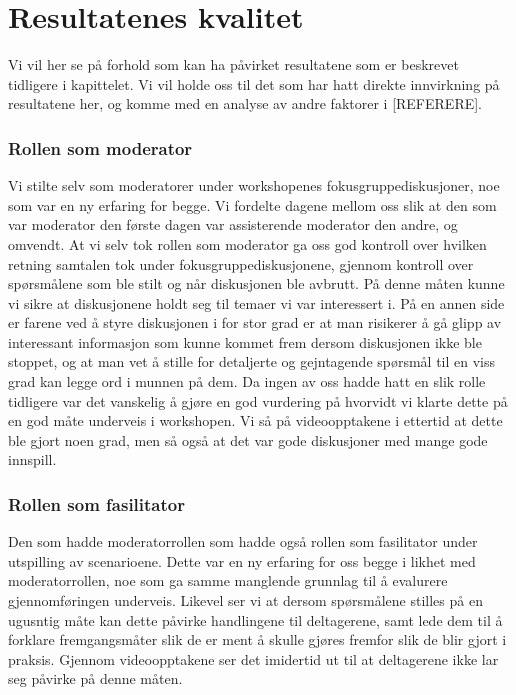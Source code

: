 \section{Resultatenes kvalitet}
\label{chp: analyse}

Vi vil her se på forhold som kan ha påvirket resultatene som er beskrevet tidligere i kapittelet. Vi vil holde oss til det som har hatt direkte innvirkning på resultatene her, og komme med en analyse av andre faktorer i [REFERERE].

\subsubsection{Rollen som moderator}
Vi stilte selv som moderatorer under workshopenes fokusgruppediskusjoner, noe som var en ny erfaring for begge. Vi fordelte dagene mellom oss slik at den som var moderator den første dagen var assisterende moderator den andre, og omvendt. At vi selv tok rollen som moderator ga oss god kontroll over hvilken retning samtalen tok under fokusgruppediskusjonene, gjennom kontroll over spørsmålene som ble stilt og når diskusjonen ble avbrutt. På denne måten kunne vi sikre at diskusjonene holdt seg til temaer vi var interessert i. På en annen side er farene ved å styre diskusjonen i for stor grad er at man risikerer å gå glipp av interessant informasjon som kunne kommet frem dersom diskusjonen ikke ble stoppet, og at man vet å stille for detaljerte og gejntagende spørsmål til en viss grad kan legge ord i munnen på dem. Da ingen av oss hadde hatt en slik rolle tidligere var det vanskelig å gjøre en god vurdering på hvorvidt vi klarte dette på en god måte underveis i workshopen. Vi så på videoopptakene i ettertid at dette ble gjort noen grad, men så også at det var gode diskusjoner med mange gode innspill.

\subsubsection{Rollen som fasilitator}
Den som hadde moderatorrollen som hadde også rollen som fasilitator under utspilling av scenarioene. Dette var en ny erfaring for oss begge i likhet med moderatorrollen, noe som ga samme manglende grunnlag til å evalurere gjennomføringen underveis. Likevel ser vi at dersom spørsmålene stilles på en ugusntig måte kan dette påvirke handlingene til deltagerene, samt lede dem til å forklare fremgangsmåter slik de er ment å skulle gjøres fremfor slik de blir gjort i praksis. Gjennom videoopptakene ser det imidertid ut til at deltagerene ikke lar seg påvirke på denne måten.


